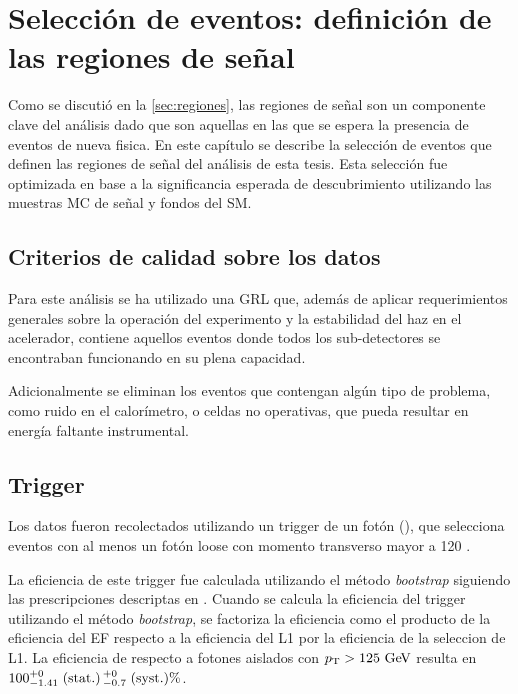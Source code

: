 \chapter{Selección de eventos: definición de las regiones de señal}
\label{cap:seleccion}

Como se discutió en la \cref{sec:regiones}, las regiones de señal son un componente clave del
análisis dado que son aquellas en las que se espera la presencia de eventos de
nueva fisica. En este capítulo se describe la selección de eventos que definen
las regiones de señal del análisis de esta tesis. Esta selección fue optimizada
en base a la significancia esperada de descubrimiento utilizando las muestras MC
de señal y fondos del SM.



\section{Criterios de calidad sobre los datos}


Para este análisis se ha utilizado una
GRL %
que, además de aplicar requerimientos generales sobre la operación del
experimento y la estabilidad del haz en el acelerador, contiene aquellos eventos
donde todos los sub-detectores se encontraban funcionando en su plena capacidad.

Adicionalmente se eliminan los eventos que contengan algún tipo de problema,
como ruido en el calorímetro, o celdas no operativas, que pueda resultar
en energía faltante instrumental. %



\section{Trigger}\label{sec:trigger}

Los datos fueron recolectados utilizando un trigger de un fotón (\trigchain), que
selecciona eventos con al menos un fotón loose con momento transverso mayor a
120 \gev.

La eficiencia de este trigger fue calculada utilizando el método \emph{bootstrap}
siguiendo las prescripciones descriptas en \cite{ATLAS-CONF-2011-114,Damazio:1609629}.
Cuando se calcula la eficiencia del trigger utilizando el método \emph{bootstrap}, se factoriza
la eficiencia como el producto de la eficiencia del EF respecto a la eficiencia del L1
por la eficiencia de la seleccion de L1.
La eficiencia de {\trigchain} respecto a fotones aislados con $\pt>125\gev$ resulta en
$100^{+0}_{-1.41}\mbox{$\;$(stat.)} \, {}^{+0}_{-0.7}\mbox{$\;$(syst.)} \%$.

